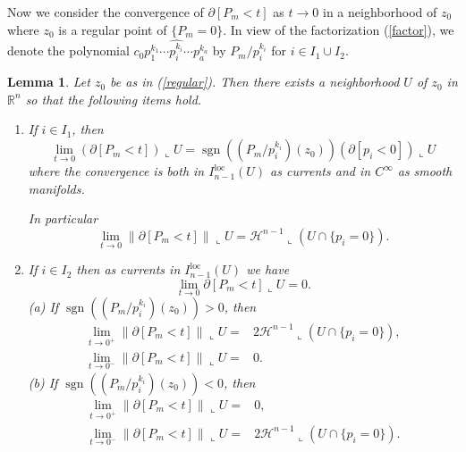 \documentclass[pdflatex,sn-mathphys-num]{sn-jnl}%
\theoremstyle{thmstyleone}%
\newtheorem{lemma}[theorem]{Lemma}
\theoremstyle{thmstyletwo}%
\theoremstyle{thmstylethree}%
\newcommand{\HH}{\mathcal{H}}
\newcommand{\R}{\mathbb{R}}
\newcommand{\loc}{\mathrm{loc}}
\DeclareMathOperator{\sgn}{sgn}
\begin{document}
Now we consider the convergence of $\partial[P_m<t]$ as $t\to0$ in a neighborhood of $z_0$ where $z_0$ is a regular point of $\{P_m=0\}$.
In view of the factorization (\ref{factor}), we denote the polynomial $c_0p_{1}^{k_1}\cdots  \widehat{p_i^{k_i}}\cdots  p_{a}^{k_{a}}$ by $P_m/p_i^{k_i}$ for $i\in I_1\cup I_2$.

\begin{lemma}\label{convls}Let $z_0$ be as in (\ref{regular}). Then there exists a neighborhood $U$ of $z_0$ in $\R^n$ so that the following items hold.
	\begin{enumerate}
		\item [(i)] If $i\in I_1$, then
		\[\lim_{t\to0}\left(\partial[P_m<t]\right)\llcorner{U}= \sgn \left(\left(P_m/p_i^{k_i}\right)(z_0)\right)\left(\partial[p_i<0]\right)\llcorner{U}\]
		where the convergence is both in $I_{n-1}^\loc(U)$ as currents and in $C^{\infty}$ as smooth manifolds.
		
		In particular
		\[\lim_{t\to0}\|\partial[P_m<t]\|\llcorner U= \HH^{n-1}\llcorner(U\cap \{p_i=0\}).\]
		\item[(ii)]  If $i\in I_2$  then as currents in $I_{n-1}^\loc(U)$ we have
		\[\lim_{t\to0}\partial[P_m<t]\llcorner U=0.\]
		(a) If $\sgn ((P_m/p_i^{k_i})(z_0))>0$, then
		\[
		\begin{aligned}
			\lim_{t\to0^+}\|\partial[P_m<t]\|\llcorner U=& 2 \HH^{n-1}\llcorner (U\cap \{p_i=0\}),\\
			\lim_{t\to0^-}\|\partial[P_m<t]\|\llcorner U=&0.
		\end{aligned}
		\]
		(b) If $\sgn ((P_m/p_i^{k_i})(z_0))<0$, then
		\[
		\begin{aligned}
			\lim_{t\to0^+}\|\partial[P_m<t]\|\llcorner U=& 0,\\
			\lim_{t\to0^-}\|\partial[P_m<t]\|\llcorner U=& 2 \HH^{n-1}\llcorner (U\cap \{p_i=0\}).
		\end{aligned}
		\]
	\end{enumerate}
\end{lemma}
\end{document}
